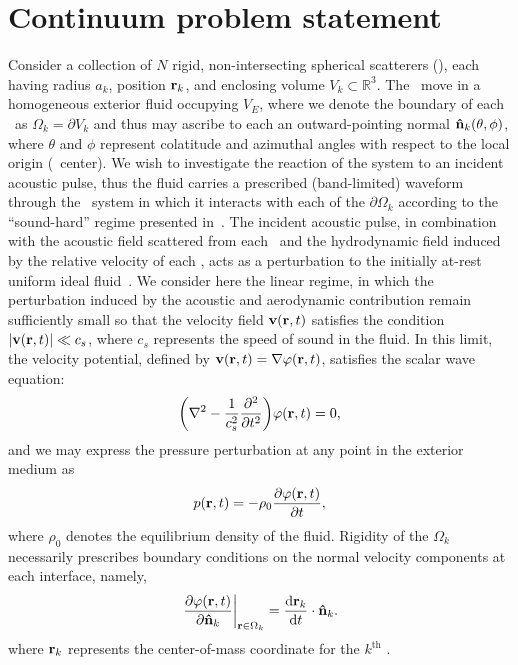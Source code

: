 \section{Continuum problem statement}

Consider a collection of $N$ rigid, non-intersecting spherical scatterers (\bubbles), each having radius $a_k$, position $\vb{r}_k$, and enclosing volume $V_k \subset \mathbb{R}^3$.
The \bubbles\ move in a homogeneous exterior fluid occupying $V_E$, where we denote the boundary of each \bubble\ as $\Omega_k = \partial V_k$ and thus may ascribe  to each an outward-pointing normal $\vu{n}_k\qty(\theta, \phi)$,
where $\theta$ and $\phi$ represent colatitude and azimuthal angles with respect to the local origin (\bubble\ center).
We wish to investigate the reaction of the system to an incident acoustic pulse, thus the fluid carries a prescribed (band-limited) waveform through the \bubble\ system in which it interacts with each of the $\partial \Omega_k$ according to the ``sound-hard'' regime presented in~\cite{Li2014}.
The incident acoustic pulse, in combination with the acoustic field scattered from each \bubble\ and the hydrodynamic field induced by the relative velocity of each \bubble, acts as a perturbation to the initially at-rest uniform ideal fluid~\cite{Myers1992, Landau2013}.
We consider here the linear regime, in which the perturbation induced by the acoustic and aerodynamic contribution remain sufficiently small so that the velocity field $\vb{v}(\vb{r}, t)$ satisfies the condition $\abs{\vb{v}(\vb{r}, t)} \ll c_s $, where $c_s$ represents the speed of sound in the fluid.
In this limit, the velocity potential, defined by $\vb{v}(\vb{r}, t) = \nabla \varphi\qty(\vb{r}, t)$, satisfies the scalar wave equation:
\begin{equation}
  \qty(\laplacian - \frac{1}{c_s^2} \pdv[2]{t}) \varphi\qty(\vb{r}, t) = 0,
  \label{eq:Helmholtz}
\end{equation}
and we may express the pressure perturbation at any point in the exterior medium as
\begin{equation} \label{eq:Bernoulli}
  p\qty(\vb{r}, t) = - \rho_0\pdv{\varphi\qty(\vb{r}, t)}{t},
\end{equation}
where $\rho_0$ denotes the equilibrium density of the fluid.
Rigidity of the $\Omega_k$ necessarily prescribes boundary conditions on the normal velocity components at each interface, namely,
\begin{equation}
  \left.\pdv{\varphi(\vb{r},t)}{\vu{n}_k}\right|_{\vb{r} \in \Omega_k} = \dv{\vb{r}_k}{t} \cdot \vu{n}_k.
  \label{eq:boundary_conditions}
\end{equation}
where $\vb{r}_k$ represents the center-of-mass coordinate for the $k^\text{th}$ \bubble.

